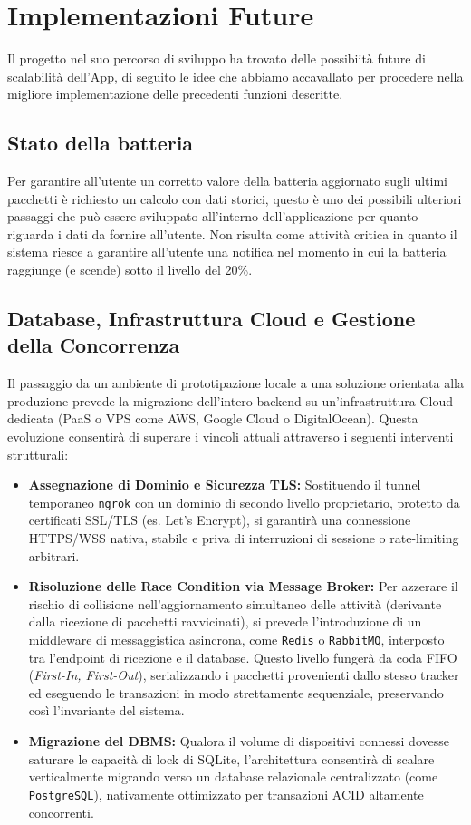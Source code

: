 \documentclass[12pt,a4paper]{article}
\begin{document}
\section{Implementazioni Future}
Il progetto nel suo percorso di sviluppo ha trovato delle possibiità future di scalabilità dell'App, di seguito le idee che abbiamo accavallato per procedere nella migliore implementazione delle precedenti funzioni descritte.

\subsection{Stato della batteria}
Per garantire all'utente un corretto valore della batteria aggiornato sugli ultimi pacchetti è richiesto un calcolo con dati storici, questo è uno dei possibili ulteriori passaggi che può essere sviluppato all'interno dell'applicazione per quanto riguarda i dati da fornire all'utente. Non risulta come attività critica in quanto il sistema riesce a garantire all'utente una notifica nel momento in cui la batteria raggiunge (e scende) sotto il livello del 20\%.

\subsection{Database, Infrastruttura Cloud e Gestione della Concorrenza}
Il passaggio da un ambiente di prototipazione locale a una soluzione orientata alla produzione prevede la migrazione dell'intero backend su un'infrastruttura Cloud dedicata (PaaS o VPS come AWS, Google Cloud o DigitalOcean). Questa evoluzione consentirà di superare i vincoli attuali attraverso i seguenti interventi strutturali:
\begin{itemize}
    \item \textbf{Assegnazione di Dominio e Sicurezza TLS:} Sostituendo il tunnel temporaneo \texttt{ngrok} con un dominio di secondo livello proprietario, protetto da certificati SSL/TLS (es. Let's Encrypt), si garantirà una connessione HTTPS/WSS nativa, stabile e priva di interruzioni di sessione o rate-limiting arbitrari.
    \item \textbf{Risoluzione delle Race Condition via Message Broker:} Per azzerare il rischio di collisione nell'aggiornamento simultaneo delle attività (derivante dalla ricezione di pacchetti ravvicinati), si prevede l'introduzione di un middleware di messaggistica asincrona, come \texttt{Redis} o \texttt{RabbitMQ}, interposto tra l'endpoint di ricezione e il database. Questo livello fungerà da coda FIFO (\textit{First-In, First-Out}), serializzando i pacchetti provenienti dallo stesso tracker ed eseguendo le transazioni in modo strettamente sequenziale, preservando così l'invariante del sistema.
    \item \textbf{Migrazione del DBMS:} Qualora il volume di dispositivi connessi dovesse saturare le capacità di lock di SQLite, l'architettura consentirà di scalare verticalmente migrando verso un database relazionale centralizzato (come \texttt{PostgreSQL}), nativamente ottimizzato per transazioni ACID altamente concorrenti.
\end{itemize}
\end{document}
